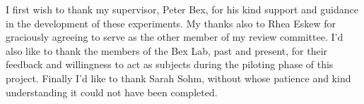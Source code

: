 
I first wish to thank my supervisor, Peter Bex, for his kind support and guidance in the development of these experiments. My thanks also to Rhea Eskew for graciously agreeing to serve as the other member of my review committee. I'd also like to thank the members of the Bex Lab, past and present, for their feedback and willingness to act as subjects during the piloting phase of this project. Finally I'd like to thank Sarah Sohm, without whose patience and kind understanding it could not have been completed.
